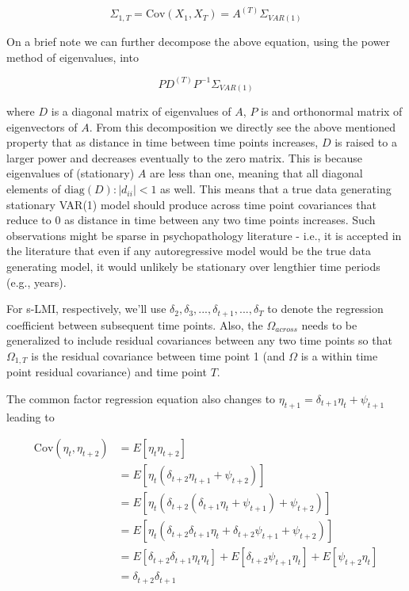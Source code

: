 \documentclass[
  letterpaper,
  DIV=11,
  numbers=noendperiod]{scrartcl}
\begin{document}
\[
\Sigma_{1,T}=\text{Cov}(X_1, X_{T}) = A^{(T)}\Sigma_{VAR(1)}
\]

On a brief note we can further decompose the above equation, using the
power method of eigenvalues, into

\[
PD^{(T)}P^{-1}\Sigma_{VAR(1)}
\]

where \(D\) is a diagonal matrix of eigenvalues of \(A\), \(P\) is and
orthonormal matrix of eigenvectors of \(A\). From this decomposition we
directly see the above mentioned property that as distance in time
between time points increases, \(D\) is raised to a larger power and
decreases eventually to the zero matrix. This is because eigenvalues of
(stationary) \(A\) are less than one, meaning that all diagonal elements
of \(\text{diag}(D):|d_{ii}|<1\) as well. This means that a true data
generating stationary VAR(1) model should produce across time point
covariances that reduce to 0 as distance in time between any two time
points increases. Such observations might be sparse in psychopathology
literature - i.e., it is accepted in the literature that even if any
autoregressive model would be the true data generating model, it would
unlikely be stationary over lengthier time periods (e.g., years).

For s-LMI, respectively, we'll use
\(\delta_2, \delta_3, ...,\delta_{t+1},..., \delta_T\) to denote the
regression coefficient between subsequent time points. Also, the
\(\Omega_{across}\) needs to be generalized to include residual
covariances between any two time points so that \(\Omega_{1,T}\) is the
residual covariance between time point 1 (and \(\Omega\) is a within
time point residual covariance) and time point \(T\).

The common factor regression equation also changes to
\(\eta_{t+1}=\delta_{t+1}\eta_{t}+\psi_{t+1}\) leading to

\[
\begin{align*}
\text{Cov}(\eta_t,\eta_{t+2})&=E[\eta_{t}\eta_{t+2}]\\
&=E[\eta_{t}  (\delta_{t+2}\eta_{t+1}+\psi_{t+2})  ]\\
&=E[\eta_{t}  (\delta_{t+2}(\delta_{t+1}\eta_{t}+\psi_{t+1})+\psi_{t+2})  ]\\
&=E[\eta_{t}  (\delta_{t+2}\delta_{t+1}\eta_{t}+\delta_{t+2}\psi_{t+1}+\psi_{t+2})  ]\\
&=E[\delta_{t+2}\delta_{t+1}\eta_{t}\eta_{t}]+E[\delta_{t+2}\psi_{t+1}\eta_{t}]+E[\psi_{t+2}\eta_{t}]\\
&=\delta_{t+2}\delta_{t+1}
\end{align*}
\]
\end{document}
